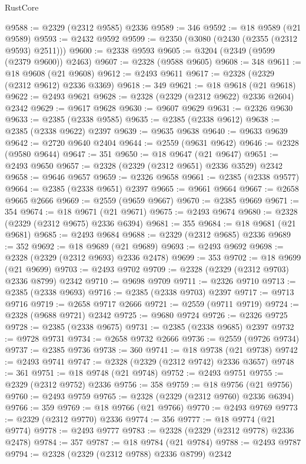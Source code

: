 \begin{lexlean}{RustCore}
\begin{coremodule}
@9588 := @2329 (@2312 @9585) @2336
@9589 := 346
@9592 := @18 @9589 (@21 @9589)
@9593 := @2432 @9592
@9599 := @2350 (@3080 (@2430 (@2355 (@2312 @9593) @2511)))
@9600 := @2338 @9593
@9605 := @3204 (@2349 (@9599 (@2379 @9600)) @2463)
@9607 := @2328 (@9588 @9605)
@9608 := 348
@9611 := @18 @9608 (@21 @9608)
@9612 := @2493 @9611
@9617 := @2328 (@2329 (@2312 @9612) @2336 @3369)
@9618 := 349
@9621 := @18 @9618 (@21 @9618)
@9622 := @2493 @9621
@9628 := @2328 (@2329 (@2312 @9622) @2336 @2604) @2342
@9629 := @9617 @9628
@9630 := @9607 @9629
@9631 := @2326 @9630
@9633 := @2385 (@2338 @9585)
@9635 := @2385 (@2338 @9612)
@9638 := @2385 (@2338 @9622) @2397
@9639 := @9635 @9638
@9640 := @9633 @9639
@9642 := @2720 @9640 @2404
@9644 := @2559 (@9631 @9642)
@9646 := @2328 (@9580 @9644)
@9647 := 351
@9650 := @18 @9647 (@21 @9647)
@9651 := @2493 @9650
@9657 := @2328 (@2329 (@2312 @9651) @2336 @3529) @2342
@9658 := @9646 @9657
@9659 := @2326 @9658
@9661 := @2385 (@2338 @9577)
@9664 := @2385 (@2338 @9651) @2397
@9665 := @9661 @9664
@9667 := @2658 @9665 @2666
@9669 := @2559 (@9659 @9667)
@9670 := @2385 @9669
@9671 := 354
@9674 := @18 @9671 (@21 @9671)
@9675 := @2493 @9674
@9680 := @2328 (@2329 (@2312 @9675) @2336 @6394)
@9681 := 355
@9684 := @18 @9681 (@21 @9681)
@9685 := @2493 @9684
@9688 := @2329 (@2312 @9685) @2336
@9689 := 352
@9692 := @18 @9689 (@21 @9689)
@9693 := @2493 @9692
@9698 := @2328 (@2329 (@2312 @9693) @2336 @2478)
@9699 := 353
@9702 := @18 @9699 (@21 @9699)
@9703 := @2493 @9702
@9709 := @2328 (@2329 (@2312 @9703) @2336 @8799) @2342
@9710 := @9698 @9709
@9711 := @2326 @9710
@9713 := @2385 (@2338 @9693)
@9716 := @2385 (@2338 @9703) @2397
@9717 := @9713 @9716
@9719 := @2658 @9717 @2666
@9721 := @2559 (@9711 @9719)
@9724 := @2328 (@9688 @9721) @2342
@9725 := @9680 @9724
@9726 := @2326 @9725
@9728 := @2385 (@2338 @9675)
@9731 := @2385 (@2338 @9685) @2397
@9732 := @9728 @9731
@9734 := @2658 @9732 @2666
@9736 := @2559 (@9726 @9734)
@9737 := @2385 @9736
@9738 := 360
@9741 := @18 @9738 (@21 @9738)
@9742 := @2493 @9741
@9747 := @2328 (@2329 (@2312 @9742) @2336 @3657)
@9748 := 361
@9751 := @18 @9748 (@21 @9748)
@9752 := @2493 @9751
@9755 := @2329 (@2312 @9752) @2336
@9756 := 358
@9759 := @18 @9756 (@21 @9756)
@9760 := @2493 @9759
@9765 := @2328 (@2329 (@2312 @9760) @2336 @6394)
@9766 := 359
@9769 := @18 @9766 (@21 @9766)
@9770 := @2493 @9769
@9773 := @2329 (@2312 @9770) @2336
@9774 := 356
@9777 := @18 @9774 (@21 @9774)
@9778 := @2493 @9777
@9783 := @2328 (@2329 (@2312 @9778) @2336 @2478)
@9784 := 357
@9787 := @18 @9784 (@21 @9784)
@9788 := @2493 @9787
@9794 := @2328 (@2329 (@2312 @9788) @2336 @8799) @2342

\end{coremodule}
\end{lexlean}
